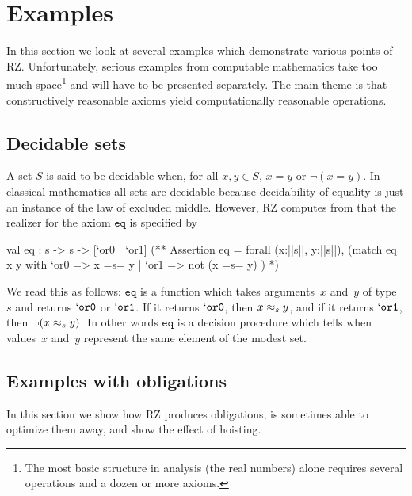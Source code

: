 \section{Examples}
\label{sec:examples}

In this section we look at several examples which demonstrate various
points of RZ. Unfortunately, serious examples from computable
mathematics take too much space\footnote{The most basic structure
  in analysis (the real numbers) alone 
  requires several operations and a dozen or more axioms.} and will have to
be presented separately. The main theme is that constructively
reasonable axioms yield computationally reasonable operations.

\subsection{Decidable sets}
\label{sec:decidable-sets}

A set $S$ is said to be decidable when, for all $x, y \in S$, $x = y$
or $\lnot (x = y)$. In classical mathematics all sets are decidable
because decidability of equality is just an instance of the law of
excluded middle. However, RZ computes from
%
%
that the realizer for the axiom $\mathtt{eq}$ is specified by
%
\begin{source}
val eq : s -> s -> [`or0 | `or1]
(**  Assertion eq =
       forall (x:||s||, y:||s||),
         (match eq x y with
            `or0 => x =s= y
          | `or1 => not (x =s= y) )
*)
\end{source}
%
We read this as follows: $\mathtt{eq}$ is a function which takes
arguments~$x$ and~$y$ of type~$s$ and returns $\mathtt{`or0}$ or
$\mathtt{`or1}$. If it returns $\mathtt{`or0}$, then $x \approx_s y$, and
if it returns $\mathtt{`or1}$, then $\lnot (x \approx_s y)$. In other
words $\mathtt{eq}$ is a decision procedure which tells when
values~$x$ and~$y$ represent the same element of the modest set.

\subsection{Examples with obligations}
\label{sec:exampl-with-oblig}

In this section we show how RZ produces obligations, is sometimes able
to optimize them away, and show the effect of hoisting.


